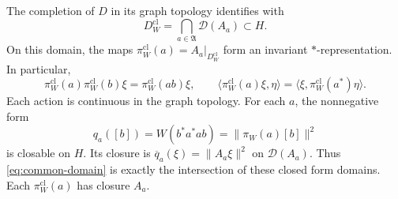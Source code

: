 \begin{theorem}
\label{thm:graph-domain}
The completion of $D$ in its graph topology identifies with
\begin{equation}
 D_W^{\mathrm{cl}}=\bigcap_{a\in\mathfrak A}\mathcal D(A_a)
 \subset H.
 \label{eq:common-domain}
\end{equation}
On this domain, the maps $\pi_W^{\mathrm{cl}}(a)=A_a|_{D_W^{\mathrm{cl}}}$
form an invariant $*$-representation.  In particular,
\begin{equation}
 \pi_W^{\mathrm{cl}}(a)\pi_W^{\mathrm{cl}}(b)\xi
 =\pi_W^{\mathrm{cl}}(ab)\xi,
 \qquad
 \langle\pi_W^{\mathrm{cl}}(a)\xi,\eta\rangle
 =\langle\xi,\pi_W^{\mathrm{cl}}(a^*)\eta\rangle.
 \label{eq:closed-products}
\end{equation}
Each action is continuous in the graph topology.
For each $a$, the nonnegative form
\[
 q_a([b])=W(b^*a^*ab)=\|\pi_W(a)[b]\|^2
\]
is closable on $H$.  Its closure is $\overline q_a(\xi)=\|A_a\xi\|^2$
on $\mathcal D(A_a)$.  Thus \eqref{eq:common-domain} is exactly the
intersection of these closed form domains.
Each $\pi_W^{\mathrm{cl}}(a)$ has closure $A_a$.
\end{theorem}

